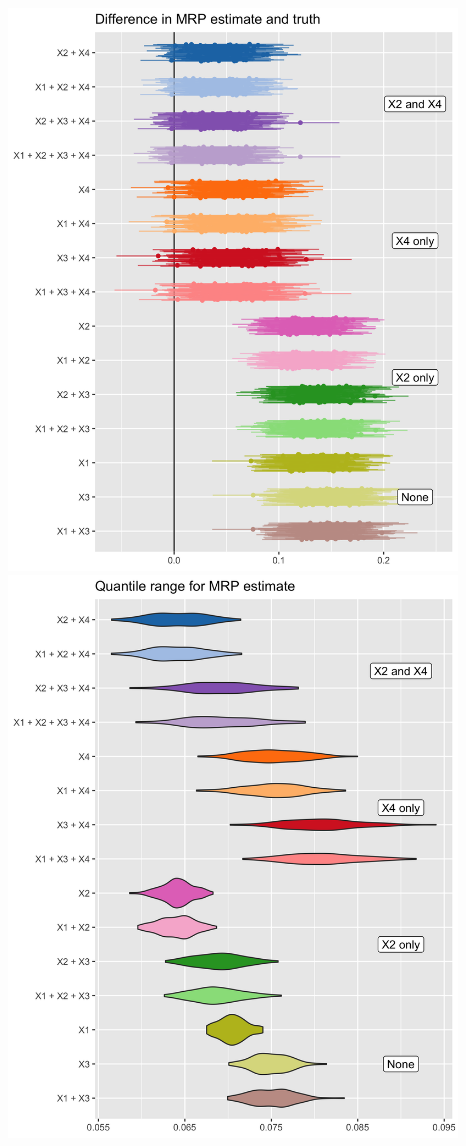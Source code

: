 \documentclass[
]{article}
\begin{document}
\includegraphics[width=4.6875in,height=\textheight]{images/3b/plot_mrp_truth.png}
\includegraphics[width=4.6875in,height=\textheight]{images/3b/plot_mrp_qt_range.png}
\end{document}
